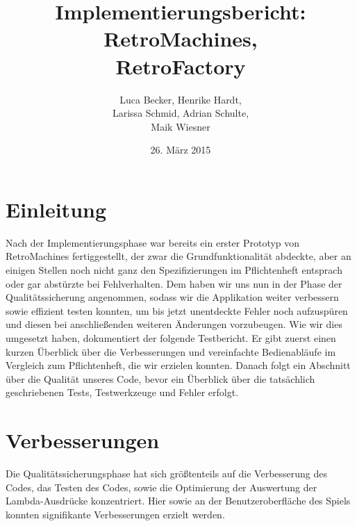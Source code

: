 \documentclass[parskip=full]{scrreprt}
\begin{document}
\title{Implementierungsbericht: RetroMachines, \\ RetroFactory}
\author{Luca Becker, Henrike Hardt,\\Larissa Schmid, Adrian Schulte,\\Maik Wiesner}
\date{26. März 2015}
\maketitle
\thispagestyle{empty}

\clearpage

\thispagestyle{empty}
\tableofcontents
\thispagestyle{empty}

\clearpage
\setcounter{page}{1}

\chapter{Einleitung}

Nach der Implementierungsphase war bereits ein erster Prototyp von RetroMachines fertiggestellt, der zwar die Grundfunktionalität abdeckte, aber an einigen Stellen noch nicht ganz den Spezifizierungen im Pflichtenheft entsprach oder gar abstürzte bei Fehlverhalten.
Dem haben wir uns nun in der Phase der Qualitätssicherung angenommen, sodass wir die Applikation weiter verbessern sowie effizient testen konnten, um bis jetzt unentdeckte Fehler noch aufzuspüren und diesen bei anschließenden weiteren Änderungen vorzubeugen.
Wie wir dies umgesetzt haben, dokumentiert der folgende Testbericht. Er gibt zuerst einen kurzen Überblick über die Verbesserungen und vereinfachte Bedienabläufe im Vergleich zum Pflichtenheft, die wir erzielen konnten. Danach folgt ein Abschnitt über die Qualität unseres Code, bevor ein Überblick über die tatsächlich geschriebenen Tests, Testwerkzeuge und Fehler erfolgt.

\chapter{Verbesserungen}

Die Qualitätssicherungsphase hat sich größtenteils auf die Verbesserung des Codes, das Testen des Codes, sowie die Optimierung der Auswertung der Lambda-Ausdrücke konzentriert. Hier sowie an der Benutzeroberfläche des Spiels konnten signifikante Verbesserungen erzielt werden. 
\end{document}
